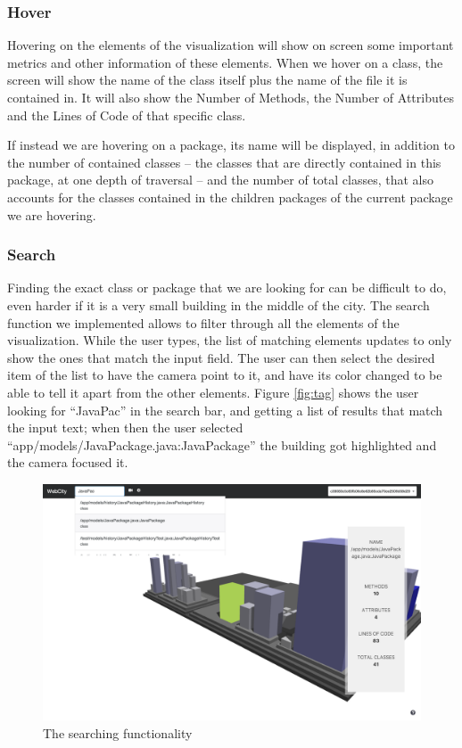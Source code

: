 \documentclass[]{usiinfbachelorproject}
\begin{document}
\subsubsection{Hover} \label{Hover}
Hovering on the elements of the visualization will show on screen some important metrics and other information of these elements.
When we hover on a class, the screen will show the name of the class itself plus the name of the file it is contained in. It will also show the Number of Methods,
 the Number of Attributes and the Lines of Code of that specific class.

 If instead we are hovering on a package, its name will be displayed, in addition to the number of contained classes -- the classes that are directly contained in this package, at one depth of traversal --
  and the number of total classes, that also accounts for the classes contained in the children packages of the current package we are hovering.

\subsubsection{Search} \label{Search}
Finding the exact class or package that we are looking for can be difficult to do, even harder if it is a very small building in the middle of the city.
The search function we implemented allows to filter through all the elements of the visualization. While the user types,
the list of matching elements updates to only show the ones that match the input field. The user can then select the desired item of the list to have the camera point to it,
and have its color changed to be able to tell it apart from the other elements.
Figure \ref{fig:tag} shows the user looking for ``JavaPac'' in the search bar, and getting a list of results that match the input text; when then the user selected ``app/models/JavaPackage.java:JavaPackage'' the building got highlighted and the camera focused it.

\begin{figure} [H]
\centering
\includegraphics[width=1\textwidth]{pictures/search.png}
\caption{The searching functionality}
\label{fig:search}
\end{figure}
\end{document}
